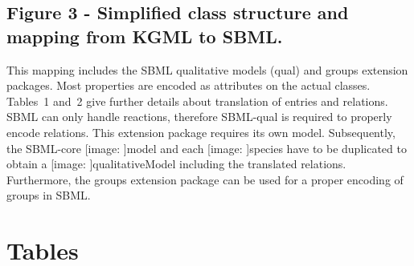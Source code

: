 \documentclass[10pt]{bmc_article}
\def\texttt{[image: ]}
\newenvironment{bmcformat}{\baselineskip20pt\sloppy\setboolean{publ}{false}}{\baselineskip20pt\sloppy}
\newcommand{\model}{\texttt{model}}
\newcommand{\qualitativeModel}{\texttt{qualitative\-Model}}
\newcommand{\species}{\texttt{species}}
\begin{document}
\begin{bmcformat}


  \subsection*{Figure 3 - Simplified class structure and mapping from KGML to SBML.}
This mapping includes the SBML qualitative models (qual) and groups extension packages. Most properties are encoded as attributes on the actual classes. Tables~1 and~2 give further details about translation of entries and relations. SBML can only handle reactions, therefore SBML-qual is required to properly encode relations. This extension package requires its own model. Subsequently, the SBML-core \model{} and each \species{} have to be duplicated to obtain a \qualitativeModel{} including the translated relations. Furthermore, the groups extension package can be used for a proper encoding of groups in SBML.





\section*{Tables}



\end{bmcformat}
\end{document}
